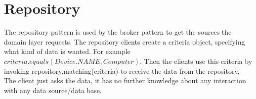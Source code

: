 %
%
%
%

\section{Repository}

The repository pattern is used by the broker pattern to get the sources the domain layer requests. The repository clients create a criteria object, specifying what kind of data is wanted. For example $criteria.equals(Device.NAME, Computer)$. Then the clients use this criteria by invoking repository.matching(criteria) to receive the data from the repository. The client just asks the data, it has no further knowledge about any interaction with any data source/data base.

